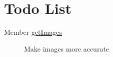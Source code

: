 \hypertarget{todo}{}\section{Todo List}\label{todo}
\label{todo__todo000001}
\hypertarget{todo__todo000001}{}
 \begin{description}
\item[Member \hyperlink{product_8inc_9dbb778854cfe105058d7161ca8f058c}{getImages} ]Make images more accurate \end{description}
